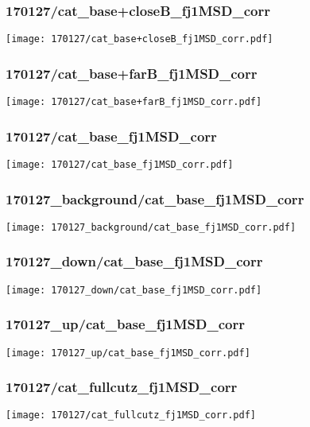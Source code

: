 \begin{frame}
   \frametitle{\small 170127/cat\_base+closeB\_fj1MSD\_corr}
   \centering
   \texttt{[image: 170127/cat\_base+closeB\_fj1MSD\_corr.pdf]}
\end{frame}

\begin{frame}
   \frametitle{\small 170127/cat\_base+farB\_fj1MSD\_corr}
   \centering
   \texttt{[image: 170127/cat\_base+farB\_fj1MSD\_corr.pdf]}
\end{frame}

\begin{frame}
   \frametitle{\small 170127/cat\_base\_fj1MSD\_corr}
   \centering
   \texttt{[image: 170127/cat\_base\_fj1MSD\_corr.pdf]}
\end{frame}

\begin{frame}
   \frametitle{\small 170127\_background/cat\_base\_fj1MSD\_corr}
   \centering
   \texttt{[image: 170127\_background/cat\_base\_fj1MSD\_corr.pdf]}
\end{frame}

\begin{frame}
   \frametitle{\small 170127\_down/cat\_base\_fj1MSD\_corr}
   \centering
   \texttt{[image: 170127\_down/cat\_base\_fj1MSD\_corr.pdf]}
\end{frame}

\begin{frame}
   \frametitle{\small 170127\_up/cat\_base\_fj1MSD\_corr}
   \centering
   \texttt{[image: 170127\_up/cat\_base\_fj1MSD\_corr.pdf]}
\end{frame}

\begin{frame}
   \frametitle{\small 170127/cat\_fullcutz\_fj1MSD\_corr}
   \centering
   \texttt{[image: 170127/cat\_fullcutz\_fj1MSD\_corr.pdf]}
\end{frame}

